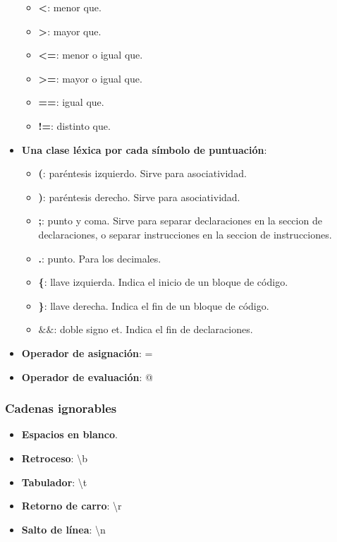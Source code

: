 \documentclass[11pt]{article}
\begin{document}
\begin{itemize}
\begin{itemize}
                    \item \textbf{\textless}: menor que.
                    \item \textbf{\textgreater}: mayor que.
                    \item \textbf{\textless=}: menor o igual que.
                    \item \textbf{\textgreater=}: mayor o igual que.
                    \item \textbf{==}: igual que.
                    \item \textbf{!=}: distinto que.
                \end{itemize}
            \item \textbf{Una clase léxica por cada símbolo de puntuación}:
                \begin{itemize}
                    \item \textbf{(}: paréntesis izquierdo. Sirve para asociatividad.
                    \item \textbf{)}: paréntesis derecho. Sirve para asociatividad.
                    \item \textbf{;}: punto y coma. Sirve para separar declaraciones en la seccion de declaraciones, o separar instrucciones en la seccion de instrucciones. 
                    \item \textbf{.}: punto. Para los decimales.
                    \item \textbf{\{}: llave izquierda. Indica el inicio de un bloque de código.
                    \item \textbf{\}}: llave derecha. Indica el fin de un bloque de código.
                    \item \textbf{$\&\&$}: doble signo et. Indica el fin de declaraciones.
                \end{itemize}
            \item \textbf{Operador de asignación}: =
            \item \textbf{Operador de evaluación}: @
        \end{itemize}
        \subsubsection*{Cadenas ignorables}
        \begin{itemize}
            \item \textbf{Espacios en blanco}.
            \item \textbf{Retroceso}: \textbackslash b
            \item \textbf{Tabulador}: \textbackslash t
            \item \textbf{Retorno de carro}: \textbackslash r
            \item \textbf{Salto de línea}: \textbackslash n
        \end{itemize}
\end{document}
